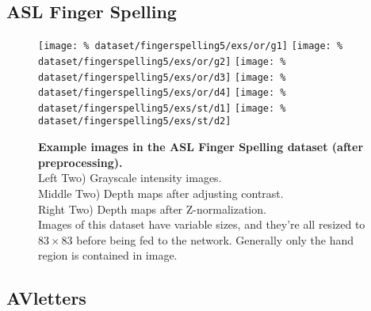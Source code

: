 \subsection{ASL Finger Spelling}

\begin{figure}[H]
  \centering
  \hfill
  \texttt{[image: \%
    dataset/fingerspelling5/exs/or/g1]}
  \hfill
  \texttt{[image: \%
    dataset/fingerspelling5/exs/or/g2]}
  \hfill
  \texttt{[image: \%
    dataset/fingerspelling5/exs/or/d3]}
  \hfill
  \texttt{[image: \%
    dataset/fingerspelling5/exs/or/d4]}
  \hfill
  \texttt{[image: \%
    dataset/fingerspelling5/exs/st/d1]}
  \hfill
  \texttt{[image: \%
    dataset/fingerspelling5/exs/st/d2]}
  \caption{%
    \textbf{Example images in the ASL Finger Spelling dataset
      (after preprocessing).}\\[0.1em]
    Left Two) Grayscale intensity images.\\[0.1em]
    Middle Two) Depth maps after adjusting contrast.\\[0.1em]
    Right Two) Depth maps after Z-normalization.\\[0.1em]
    Images of this dataset have variable sizes, and they're all resized to
    $83 \times 83$ before being fed to the network. Generally only the
    hand region is contained in image.}
  \label{fig:fingerspelling_exs}
\end{figure}

\subsection{AVletters}

